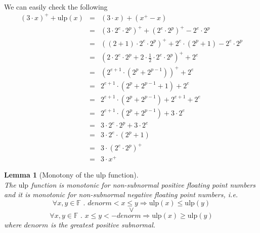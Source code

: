 \documentclass[a4paper,10pt,twoside]{article}
\newtheorem{lemma}[theorem]{Lemma}
\newenvironment{proof}[1][Proof]{\begin{trivlist}
\item[\hskip \labelsep {\bfseries #1}]}{\end{trivlist}}
\newcommand{\qed}{\nobreak \ifvmode \relax \else \ifdim \lastskip<1.5em \hskip-\lastskip
\hskip1.5em plus0em minus0.5em \fi \nobreak \vrule height0.75em width0.5em depth0.25em\fi}
\newcommand{\F}{\ensuremath{\mathbb {F}}}
\newcommand{\mUlp}{\ensuremath{\mathrm{ulp}}}
\begin{document}
\begin{proof} ~ \\
We can easily check the following 
\begin{eqnarray*}
\left( 3 \cdot x \right)^+ + \mUlp\left( x \right) & = & \left( 3 \cdot x \right) + \left( x^+ - x \right) \\
& = & \left( 3 \cdot 2^e \cdot 2^p \right)^+ + \left( 2^e \cdot 2^p \right)^+ - 2^e \cdot 2^p \\
& = & \left( \left( 2 + 1 \right) \cdot 2^e \cdot 2^p \right)^+ + 2^e \cdot \left( 2^p + 1 \right) - 2^e \cdot 2^p \\
& = & \left( 2 \cdot 2^e \cdot 2^p + 2 \cdot \frac{1}{2} \cdot 2^e \cdot 2^p \right)^+ + 2^e \\
& = & \left( 2^{e+1} \cdot \left( 2^p + 2^{p-1} \right) \right)^+ + 2^e \\
& = & 2^{e+1} \cdot \left( 2^p + 2^{p-1} + 1 \right) + 2^e \\
& = & 2^{e+1} \cdot \left( 2^p + 2^{p-1} \right) + 2^{e+1} + 2^e \\
& = & 2^{e+1} \cdot \left( 2^p + 2^{p-1} \right) + 3 \cdot 2^e \\
& = & 3 \cdot 2^e \cdot 2^p + 3 \cdot 2^e \\
& = & 3 \cdot 2^e \cdot \left( 2^p + 1 \right) \\
& = & 3 \cdot \left( 2^e \cdot 2^p \right)^+ \\
& = & 3 \cdot x^+ 
\end{eqnarray*}
\qed
\end{proof}
\begin{lemma}[Monotony of the $\mUlp$ function] \label{ulpmonoton} ~ \\
The $\mUlp$ function is monotonic for non-subnormal positive floating point numbers and it is monotonic for non-subnormal 
negative floating point numbers, i.e. 
$$\forall x,y \in \F \mbox{ . } denorm < x \leq y \Rightarrow \mUlp\left( x \right) \leq \mUlp\left( y \right)$$
$$\lor$$
$$\forall x,y \in \F \mbox{ . } x \leq y < -denorm \Rightarrow \mUlp\left( x \right) \geq \mUlp\left( y \right)$$
where $denorm$ is the greatest positive subnormal.
\end{lemma}
\end{document}
